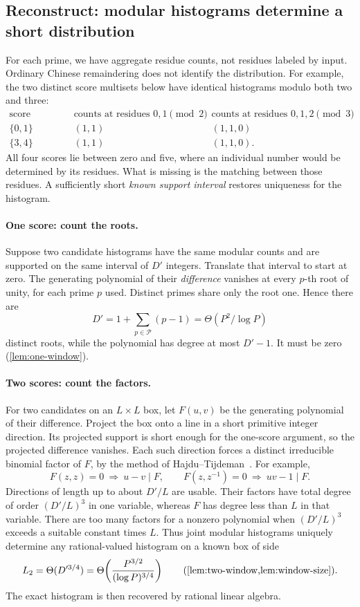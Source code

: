 \documentclass[11pt,letterpaper]{article}
\theoremstyle{definition}
\theoremstyle{remark}
\begin{document}
\subsection{Reconstruct: modular histograms determine a short distribution}

For each prime, we have aggregate residue counts, not residues labeled
by input. Ordinary Chinese remaindering does not identify the
distribution. For example, the two distinct score multisets below
have identical histograms modulo both two and three:
\[
\begin{array}{c|c|c}
 \text{score multiset}&\text{counts at residues }0,1\pmod2
  &\text{counts at residues }0,1,2\pmod3\\ \hline
 \{0,1\}&(1,1)&(1,1,0)\\
 \{3,4\}&(1,1)&(1,1,0).
\end{array}
\]
All four scores lie between zero and five, where an individual
number would be determined by its residues. What is missing is the
matching between those residues. A sufficiently short \emph{known
support interval} restores uniqueness for the histogram.

\paragraph{One score: count the roots.}
Suppose two candidate histograms have the same modular counts and
are supported on the same interval of \(D'\) integers. Translate
that interval to start at zero. The generating polynomial of their
\emph{difference} vanishes at every \(p\)-th root of unity, for each
prime \(p\) used. Distinct primes share only the root one. Hence
there are
\[
 D'=1+\sum_{p\in\mathcal P}(p-1)=\Theta(P^2/\log P)
\]
distinct roots, while the polynomial has degree at most \(D'-1\).
It must be zero (\cref{lem:one-window}).

\paragraph{Two scores: count the factors.}
For two candidates on an \(L\times L\) box, let \(F(u,v)\) be the
generating polynomial of their difference. Project the box onto a
line in a short primitive integer direction. Its projected support
is short enough for the one-score argument, so the projected
difference vanishes. Each such direction forces a distinct
irreducible binomial factor of \(F\), by the method of
Hajdu--Tijdeman~\cite{HT01}. For example,
\[
 F(z,z)=0\ \Longrightarrow\ u-v\mid F,
 \qquad
 F(z,z^{-1})=0\ \Longrightarrow\ uv-1\mid F.
\]
Directions of length up to about \(D'/L\) are usable. Their factors
have total degree of order \((D'/L)^3\) in one variable, whereas
\(F\) has degree less than \(L\) in that variable. There are too
many factors for a nonzero polynomial when \((D'/L)^3\) exceeds a
suitable constant times \(L\). Thus joint modular histograms
uniquely determine any rational-valued histogram on a known box of
side
\[
 L_2=\Theta(D'^{3/4})
    =\Theta\!\left(\frac{P^{3/2}}{(\log P)^{3/4}}\right)
 \qquad\text{(\cref{lem:two-window,lem:window-size}).}
\]
The exact histogram is then recovered by rational linear algebra.
\end{document}
